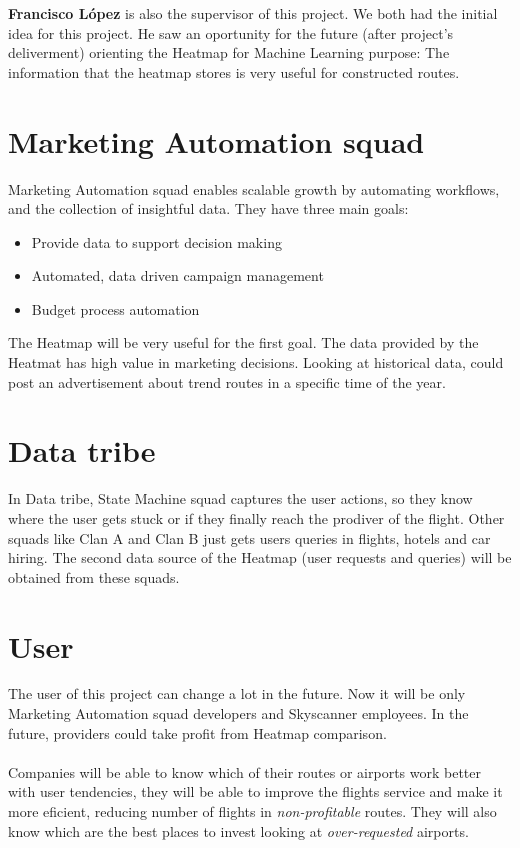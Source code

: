 \textbf{Francisco López} is also the supervisor of this project. We both had the initial idea for this project. He saw an oportunity for the future (after project's deliverment) orienting the Heatmap for Machine Learning purpose: The information that the heatmap stores is very useful for constructed routes.


\section{Marketing Automation squad} \label{mas}

Marketing Automation squad enables scalable growth by automating workflows, and the collection of insightful data. They have three main goals:

\begin{itemize}
  \item Provide data to support decision making
  \item Automated, data driven campaign management
  \item Budget process automation
\end{itemize}

The Heatmap will be very useful for the first goal. The data provided by the Heatmat has high value in marketing decisions. Looking at historical data,  could post an advertisement about trend routes in a specific time of the year.

\section{Data tribe}

In Data tribe, State Machine squad captures the user actions, so they know where the user gets stuck or if they finally reach the prodiver of the flight. Other squads like Clan A and Clan B just gets users queries in flights, hotels and car hiring. The second data source of the Heatmap (user requests and queries) will be obtained from these squads.

\section{User}

The user of this project can change a lot in the future. Now it will be only Marketing Automation squad developers and Skyscanner employees. In the future, providers could take profit from Heatmap comparison.
\\\\
Companies will be able to know which of their routes or airports work better with user tendencies, they will be able to improve the flights service and make it more eficient, reducing number of flights in \textit{non-profitable} routes. They will also know which are the best places to invest looking at \textit{over-requested} airports.